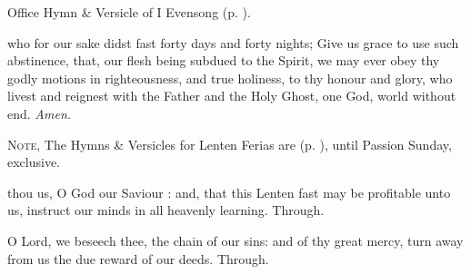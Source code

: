 \clearpage
\secondEvensong

\begin{rubric}
	Office Hymn \& Versicle of I Evensong (p. \pageref{FirstLentEvensong}).
\end{rubric}




\collect
{} who for our sake didst fast forty days and forty nights; Give us grace to use such abstinence, that, our flesh being subdued to the Spirit, we may ever obey thy godly motions in righteousness, and true holiness, to thy honour and glory, who livest and reignest with the Father and the Holy Ghost, one God, world without end. \textit{Amen.}

\begin{rubric}
	\textsc{Note,} The Hymns \& Versicles for Lenten Ferias are  (p. \pageref{FirstLentEvensong}), until Passion Sunday, exclusive.
\end{rubric}



\mattins



{} thou us, O God our Saviour : and, that this Lenten fast may be profitable unto us, instruct our minds in all heavenly learning. Through.


\secondEvensong



 O Lord, we beseech thee, the chain of our sins: and of thy great mercy, turn away from us the due reward of our deeds. Through.

